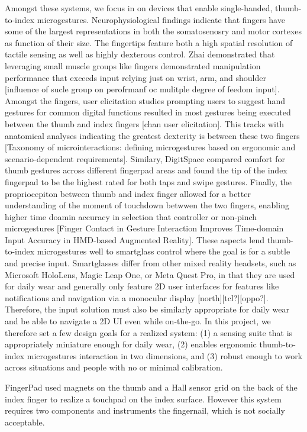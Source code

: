 \documentclass [11pt, proquest] {uwthesis}[2020/02/24]
\begin{document}
Amongst these systems, we focus in on devices that enable single-handed, thumb-to-index microgestures.  Neurophysiological findings indicate that fingers have some of the largest representations in both the somatosenosry and motor cortexes as function of their size. The fingertips feature both a high spatial resolution of tactile sensing as well as highly dexterous control. Zhai demonstrated that leveraging small muscle groups like fingers demonstrated manipulation performance that exceeds input relying just on wrist, arm, and shoulder [influence of sucle group on perofrmanf oc mulitple degree of feedom input]. Amongst the fingers, user elicitation studies prompting users to suggest hand gestures for common digital functions resulted in most gestures being executed between the thumb and index fingers [chan user elicitation]. This tracks with  anatomical analyses indicating the greatest dexterity is between these two fingers [Taxonomy of microinteractions: defining microgestures based on ergonomic and scenario-dependent requirements]. Similary, DigitSpace compared comfort for thumb gestures across different fingerpad areas and found the tip of the index fingerpad to be the highest rated for both taps and swipe gestures. Finally, the propriocepiton between thumb and index finger allowed for a better understanding of the moment of touchdown betwwen the two fingers, enabling higher time doamin accuracy in selection that controller or non-pinch microgestures [Finger Contact in Gesture Interaction Improves Time-domain Input Accuracy in HMD-based Augmented Reality]. These aspects lend thumb-to-index microgestures well to smartglass control where the goal is for a subtle and precise input. Smartglasses differ from other mixed reality headsets, such as Microsoft HoloLens, Magic Leap One, or Meta Quest Pro, in that they are used for daily wear and generally only feature 2D user interfaces for features like notifications and navigation via a monocular display [north][tcl?][oppo?]. Therefore, the input solution must also be similarly appropriate for daily wear and be able to navigate a 2D UI even while on-the-go. In this project, we therefore set a few design goals for a realized system: (1) a sensing suite that is appropriately miniature enough for daily wear, (2) enables ergonomic thumb-to-index microgestures interaction in two dimensions, and (3) robust enough to work across situations and people with no or minimal calibration. 


FingerPad used magnets on the thumb and a Hall sensor grid on the back of the index finger to realize a touchpad on the index surface. However this system requires two components and instruments the fingernail, which is not socially acceptable. 
\end{document}

